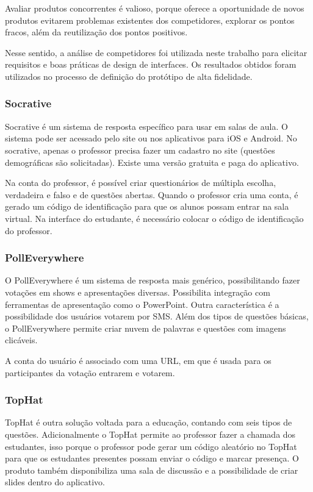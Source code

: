 Avaliar produtos concorrentes é valioso, porque oferece a oportunidade de novos
produtos evitarem problemas existentes dos competidores, explorar os pontos
fracos, além da reutilização dos pontos positivos.

Nesse sentido, a análise de competidores foi utilizada neste trabalho para elicitar requisitos e boas práticas
de design de interfaces. %
Os resultados obtidos foram utilizados no processo de definição do
protótipo de alta fidelidade.

\subsubsection{Socrative}

Socrative é um sistema de resposta específico para usar em salas de aula. O sistema pode ser
acessado pelo site ou nos aplicativos para iOS e Android. No socrative, apenas o professor
precisa fazer um cadastro no site (questões demográficas são solicitadas). Existe uma versão
gratuita e paga do aplicativo.

Na conta do professor, é possível criar questionários de múltipla escolha, verdadeira e falso e
de questões abertas. Quando o professor cria uma conta, é gerado um código de identificação
para que os alunos possam entrar na sala virtual. Na interface do estudante, é necessário
colocar o código de identificação do professor.

\subsubsection{PollEverywhere}

O PollEverywhere é um sistema de resposta mais genérico, possibilitando fazer votações em
shows e apresentações diversas. Possibilita integração com ferramentas de apresentação
como o PowerPoint. Outra característica é a possibilidade dos usuários votarem por SMS.
Além dos tipos de questões básicas, o PollEverywhere permite criar nuvem de palavras e
questões com imagens clicáveis.

A conta do usuário é associado com uma URL, em que é usada para os participantes
da votação entrarem e votarem.

\subsubsection{TopHat}

TopHat é outra solução voltada para a educação, contando com seis tipos de questões.
Adicionalmente o TopHat permite ao professor fazer a chamada dos estudantes, isso porque
o professor pode gerar um código aleatório no TopHat para que os estudantes presentes
possam enviar o código e marcar presença. O produto também disponibiliza uma sala
de discussão e a possibilidade de criar slides dentro do aplicativo.

